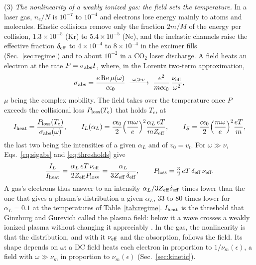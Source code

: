 \documentclass[11pt]{article}
\numberwithin{equation}{section}
\begin{document}
{\noindent}(3) \emph{The nonlinearity of a weakly ionized gas: the field sets the
temperature.} In a laser gas, $n_e/N$ is $10^{-7}$ to $10^{-4}$ and electrons lose
energy mainly to atoms and molecules. Elastic collisions remove only the fraction
$2m/M$ of the energy per collision, $1.3\times10^{-5}$ (Kr) to $5.4\times10^{-5}$ (Ne),
and the inelastic channels raise the effective fraction $\delta_{\rm eff}$ to
$4\times10^{-4}$ to $8\times10^{-4}$ in the excimer fills (Sec.~\ref{sec:regime}) and to
about $10^{-2}$ in a CO$_2$ laser discharge. A field heats
an electron at the rate $P=\sigma_{\rm abs}I$, where, in the Lorentz two-term
approximation,
\begin{equation}
\sigma_{\rm abs}=\frac{e\,{\rm Re}\,\mu(\omega)}{c\epsilon_0}
\;\xrightarrow{\;\omega\gg\nu\;}\;\frac{e^2}{mc\epsilon_0}\,\frac{\nu_{\rm eff}}{\omega^2},
\label{eq:sigabs}
\end{equation}
$\mu$ being the complex mobility. The field takes over the temperature once $P$
exceeds the collisional loss $P_{\rm loss}(T_e)$ that holds $T_e$, at
\begin{equation}
I_{\rm heat}=\frac{P_{\rm loss}(T_e)}{\sigma_{\rm abs}(\omega)},\qquad
I_L(\alpha_L)=\frac{c\epsilon_0}{2}\Big(\frac{m\omega}{e}\Big)^2\frac{\alpha_L\,eT}{mZ_{\rm eff}},\qquad
I_S=\frac{c\epsilon_0}{2}\Big(\frac{m\omega}{e}\Big)^2\frac{eT}{m},
\label{eq:thresholds}
\end{equation}
the last two being the intensities of a given $\alpha_L$ and of $v_0=v_t$. For
$\omega\gg\nu$, Eqs.~\eqref{eq:sigabs} and \eqref{eq:thresholds} give
\begin{equation}
\frac{I_L}{I_{\rm heat}}=\frac{\alpha_L\,eT\,\nu_{\rm eff}}{2Z_{\rm eff}P_{\rm loss}}
=\frac{\alpha_L}{3Z_{\rm eff}\,\delta_{\rm eff}},\qquad
P_{\rm loss}=\tfrac32\,eT\,\delta_{\rm eff}\,\nu_{\rm eff}.
\label{eq:ratio}
\end{equation}
A gas's electrons thus answer to an intensity $\alpha_L/3Z_{\rm eff}\delta_{\rm eff}$ times
lower than the one that gives a plasma's distribution a given $\alpha_L$, 33 to 80 times
lower for $\alpha_L=0.1$ at the temperatures of Table~\ref{tab:regime}. $I_{\rm heat}$ is
the threshold that Ginzburg and Gurevich called the plasma field: below it a wave
crosses a weakly ionized plasma without changing it appreciably
\cite{GinzburgGurevich1960,Gurevich1978}.
In the gas, the nonlinearity is that the distribution, and with it $\nu_{\rm eff}$ and
the absorption, follows the field. Its shape depends on $\omega$: a DC field heats
each electron in proportion to $1/\nu_m(\epsilon)$, a field with $\omega\gg\nu_m$
in proportion to $\nu_m(\epsilon)$ (Sec.~\ref{sec:kinetic}).
\end{document}
